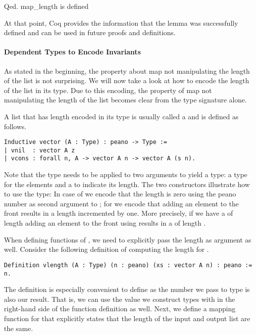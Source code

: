 \begin{cproof}{Qed.}
map_length is defined
\end{cproof}

At that point, Coq provides the information that the lemma  was successfully defined and can be used in future proofs and definitions.

\paragraph{Dependent Types to Encode Invariants}

As stated in the beginning, the property about map not manipulating the length of the list is not surprising.
We will now take a look at how to encode the length of the list in its type.
Due to this encoding, the property of map not manipulating the length of the list becomes clear from the type signature alone.

A list that has length encoded in its type is usually called a  and is defined as follows.

\begin{verbatim}
Inductive vector (A : Type) : peano -> Type :=
| vnil  : vector A z
| vcons : forall n, A -> vector A n -> vector A (s n).
\end{verbatim}

Note that the type  needs to be applied to two arguments to yield a type: a type for the elements and a  to indicate its length.
The two constructors illustrate how to use the type: In case of  we encode that the length is zero using the peano number  as second argument to ; for  we encode that adding an element to the front results in a length incremented by one.
More precisely, if we have a  of length  adding an element to the front using  results in a  of length .

When defining functions of , we need to explicitly pass the length as argument as well.
Consider the following definition of computing the length for .

\begin{verbatim}
Definition vlength (A : Type) (n : peano) (xs : vector A n) : peano := n.
\end{verbatim}

The definition is especially convenient to define as the  number  we pass to type  is also our result.
That is, we can use the value we construct types with in the right-hand side of the function definition as well.
Next, we define a mapping function for  that explicitly states that the length of the input and output list are the same.

